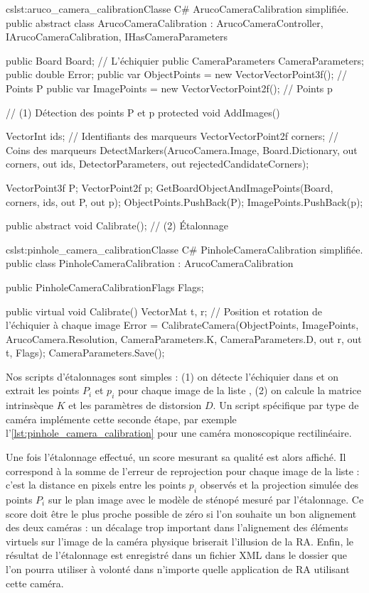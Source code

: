 \begin{listingETS}{cs}{lst:aruco_camera_calibration}{Classe C\# ArucoCameraCalibration simplifiée.}
  public abstract class ArucoCameraCalibration : ArucoCameraController, IArucoCameraCalibration, IHasCameraParameters
  {
    public Board Board; // L'échiquier
    public CameraParameters CameraParameters;
    public double Error;
    public var ObjectPoints = new VectorVectorPoint3f(); // Points P
    public var ImagePoints = new VectorVectorPoint2f(); // Points p

    // (1) Détection des points P et p
    protected void AddImages()
    {
      VectorInt ids; // Identifiants des marqueurs
      VectorVectorPoint2f corners; // Coins des marqueurs
      DetectMarkers(ArucoCamera.Image, Board.Dictionary, out corners, out ids, DetectorParameters, out rejectedCandidateCorners);
      
      VectorPoint3f P;
      VectorPoint2f p;
      GetBoardObjectAndImagePoints(Board, corners, ids, out P, out p);
      ObjectPoints.PushBack(P);
      ImagePoints.PushBack(p);
    }

    public abstract void Calibrate(); // (2) Étalonnage
  }
\end{listingETS}

\begin{listingETS}{cs}{lst:pinhole_camera_calibration}{Classe C\# PinholeCameraCalibration simplifiée.}
  public class PinholeCameraCalibration : ArucoCameraCalibration
  {
    public PinholeCameraCalibrationFlags Flags;

    public virtual void Calibrate()
    {
      VectorMat t, r; // Position et rotation de l'échiquier à chaque image
      Error = CalibrateCamera(ObjectPoints, ImagePoints, ArucoCamera.Resolution, CameraParameters.K, CameraParameters.D, out r, out t, Flags);
      CameraParameters.Save();
    }
  }
\end{listingETS}

Nos scripts d'étalonnages sont simples : (1) on détecte l'échiquier dans et on extrait les points $P_i$ et $p_i$ pour chaque image de la liste , (2) on calcule la matrice intrinsèque $K$ et les paramètres de distorsion $D$. Un script spécifique par type de caméra implémente cette seconde étape, par exemple l'\autoref{lst:pinhole_camera_calibration} pour une caméra monoscopique rectilinéaire.

Une fois l'étalonnage effectué, un score mesurant sa qualité est alors affiché. Il correspond à la somme de l'erreur de reprojection pour chaque image de la liste : c'est la distance en pixels entre les points $p_i$ observés et la projection simulée des points $P_i$ sur le plan image avec le modèle de sténopé mesuré par l'étalonnage. Ce score doit être le plus proche possible de zéro si l'on souhaite un bon alignement des deux caméras : un décalage trop important dans l'alignement des éléments virtuels sur l'image de la caméra physique briserait l'illusion de la RA. Enfin, le résultat de l'étalonnage est enregistré dans un fichier XML dans le dossier  que l'on pourra utiliser à volonté dans n'importe quelle application de RA utilisant cette caméra.

